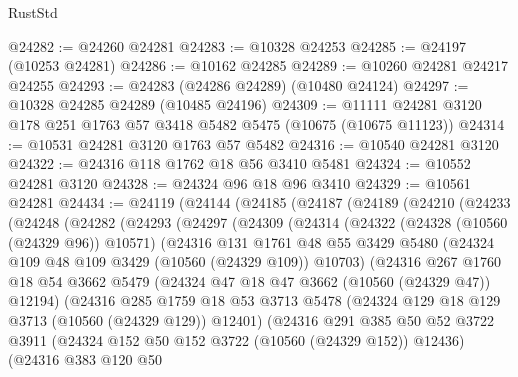 \begin{lexlean}{RustStd}
\begin{coremodule}
@24282 := @24260 @24281
@24283 := @10328 @24253
@24285 := @24197 (@10253 @24281)
@24286 := @10162 @24285
@24289 := @10260 @24281 @24217 @24255
@24293 := @24283 (@24286 @24289) (@10480 @24124)
@24297 := @10328 @24285 @24289 (@10485 @24196)
@24309 := @11111 @24281 @3120 @178 @251 @1763 @57 @3418 @5482 @5475 (@10675 (@10675 @11123))
@24314 := @10531 @24281 @3120 @1763 @57 @5482
@24316 := @10540 @24281 @3120
@24322 := @24316 @118 @1762 @18 @56 @3410 @5481
@24324 := @10552 @24281 @3120
@24328 := @24324 @96 @18 @96 @3410
@24329 := @10561 @24281
@24434 := @24119
    (@24144
      (@24185
        (@24187
          (@24189
            (@24210
              (@24233
                (@24248
                  (@24282
                    (@24293
                      (@24297
                        (@24309
                          (@24314
                            (@24322
                              (@24328 (@10560 (@24329 @96)) @10571)
                              (@24316
                                @131
                                @1761
                                @48
                                @55
                                @3429
                                @5480
                                (@24324 @109 @48 @109 @3429 (@10560 (@24329 @109)) @10703)
                                (@24316
                                  @267
                                  @1760
                                  @18
                                  @54
                                  @3662
                                  @5479
                                  (@24324 @47 @18 @47 @3662 (@10560 (@24329 @47)) @12194)
                                  (@24316
                                    @285
                                    @1759
                                    @18
                                    @53
                                    @3713
                                    @5478
                                    (@24324 @129 @18 @129 @3713 (@10560 (@24329 @129)) @12401)
                                    (@24316
                                      @291
                                      @385
                                      @50
                                      @52
                                      @3722
                                      @3911
                                      (@24324 @152 @50 @152 @3722 (@10560 (@24329 @152)) @12436)
                                      (@24316
                                        @383
                                        @120
                                        @50

\end{coremodule}
\end{lexlean}
